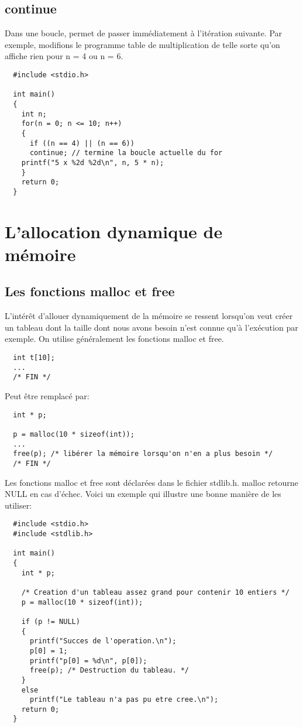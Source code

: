 \documentclass[a4paper]{article}
\begin{document}
\subsection{continue}
Dans une boucle, permet de passer immédiatement à l'itération suivante. Par exemple, modifions le programme table de multiplication de telle sorte qu'on affiche rien pour n = 4 ou n = 6.
\begin{lstlisting}
  #include <stdio.h>

  int main()
  {
    int n;
    for(n = 0; n <= 10; n++)
    {
      if ((n == 4) || (n == 6))
      continue; // termine la boucle actuelle du for
    printf("5 x %2d %2d\n", n, 5 * n);
    }
    return 0;
  }
\end{lstlisting}
\section{L'allocation dynamique de mémoire}
\subsection{Les fonctions malloc et free}
L'intérêt d'allouer dynamiquement de la mémoire se ressent lorsqu'on veut créer un tableau dont la taille dont nous avons besoin n'est connue qu'à l'exécution par exemple. On utilise généralement les fonctions malloc et free.
\begin{lstlisting}
  int t[10];
  ...
  /* FIN */
\end{lstlisting}
Peut être remplacé par:
\begin{lstlisting}
  int * p;

  p = malloc(10 * sizeof(int));
  ...
  free(p); /* libérer la mémoire lorsqu'on n'en a plus besoin */
  /* FIN */
\end{lstlisting}
Les fonctions malloc et free sont déclarées dans le fichier stdlib.h. malloc retourne NULL en cas d'échec. Voici un exemple qui illustre une bonne manière de les utiliser:
\begin{lstlisting}
  #include <stdio.h>
  #include <stdlib.h>

  int main()
  {
    int * p;

    /* Creation d'un tableau assez grand pour contenir 10 entiers */
    p = malloc(10 * sizeof(int));

    if (p != NULL)
    {
      printf("Succes de l'operation.\n");
      p[0] = 1;
      printf("p[0] = %d\n", p[0]);
      free(p); /* Destruction du tableau. */
    }
    else
      printf("Le tableau n'a pas pu etre cree.\n");
    return 0;
  }
\end{lstlisting}
\end{document}
